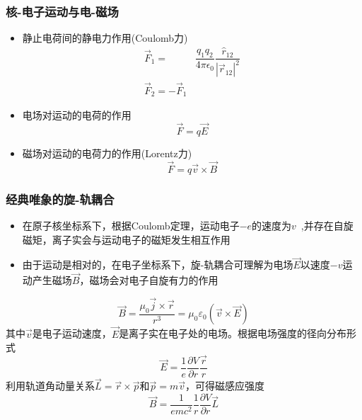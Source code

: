 \frame
{
\frametitle{核-电子运动与电-磁场}
\begin{itemize}
	\item 静止电荷间的静电力作用(\textrm{Coulomb}力)
		\begin{displaymath}
			\begin{aligned}
				\vec F_1=&\dfrac{q_1q_2}{4\pi\epsilon_0}\dfrac{\hat r_{12}}{|\vec r_{12}|^2}\\
				\vec F_2=-\vec F_1
			\end{aligned}
		\end{displaymath}
	\item 电场对运动的电荷的作用
		\begin{displaymath}
			\vec F=q\vec E
		\end{displaymath}
	\item 磁场对运动的电荷力的作用(\textrm{Lorentz}力)
		\begin{displaymath}
		\vec F=q\vec v\times\vec B
		\end{displaymath}
\end{itemize}
}

\frame
{
	\frametitle{经典唯象的旋-轨耦合}
	\begin{itemize}
		\item 在原子核坐标系下，根据\textrm{Coulomb}定理，运动电子$-e$的速度为$v$~,并存在自旋磁矩，离子实会与运动电子的磁矩发生相互作用
		\item 由于运动是相对的，在电子坐标系下，旋-轨耦合可理解为电场$\vec E$以速度$-v$运动产生磁场$\vec B$，磁场会对电子自旋有力的作用
	\end{itemize}
	\begin{displaymath}
		\vec B=\frac{\mu_0\vec j\times\vec r}{r^3}=\mu_0\varepsilon_0(\vec v\times\vec E)
	\end{displaymath}
其中$\vec v$是电子运动速度，$\vec E$是离子实在电子处的电场。根据电场强度的径向分布形式
\begin{displaymath}
	\vec E=\frac1{e}\frac{\partial V}{\partial r}\frac{\vec r}r
\end{displaymath}
利用轨道角动量关系$\vec L=\vec r\times\vec p$和$\vec p=m\vec v$，可得磁感应强度
\begin{displaymath}
	\vec B=\frac1{emc^2}\frac1r\frac{\partial V}{\partial r}\vec L
\end{displaymath}
}

